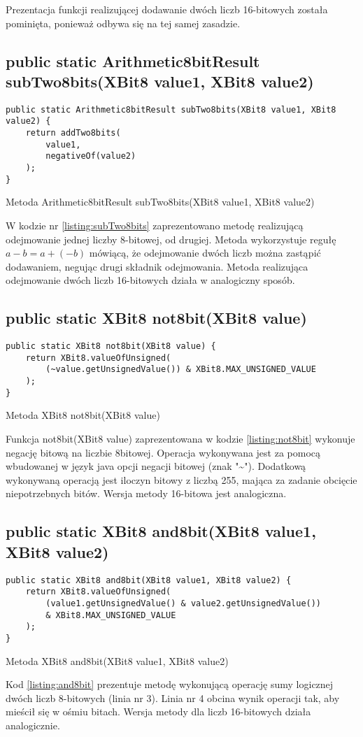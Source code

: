 	Prezentacja funkcji realizującej dodawanie dwóch liczb 16-bitowych została pominięta, ponieważ odbywa się na tej samej zasadzie.
	
	\subsection{public static Arithmetic8bitResult subTwo8bits(XBit8 value1, XBit8 value2)}
	\begin{listing}[h]
		\begin{verbatim}
public static Arithmetic8bitResult subTwo8bits(XBit8 value1, XBit8 value2) {
	return addTwo8bits(
		value1,
		negativeOf(value2)
	);
}
		\end{verbatim}
		\caption{Metoda Arithmetic8bitResult subTwo8bits(XBit8 value1, XBit8 value2)}
		\label{listing:subTwo8bits}
	\end{listing}
	W kodzie nr \ref{listing:subTwo8bits} zaprezentowano metodę realizującą odejmowanie jednej liczby 8-bitowej, od drugiej. Metoda wykorzystuje regułę 
	$ a - b = a+(-b) $ mówiącą, że odejmowanie dwóch liczb można zastąpić dodawaniem, negując drugi składnik odejmowania. 
	Metoda realizująca odejmowanie dwóch liczb 16-bitowych działa w analogiczny sposób.
	
	\subsection{public static XBit8 not8bit(XBit8 value)}
	\begin{listing}[h]
		\begin{verbatim}
public static XBit8 not8bit(XBit8 value) {
	return XBit8.valueOfUnsigned(
		(~value.getUnsignedValue()) & XBit8.MAX_UNSIGNED_VALUE
	);
}		
		\end{verbatim}
		\caption{Metoda XBit8 not8bit(XBit8 value)}
		\label{listing:not8bit}
	\end{listing}
	Funkcja not8bit(XBit8 value) zaprezentowana w kodzie \ref{listing:not8bit} wykonuje negację bitową na liczbie 8bitowej. Operacja wykonywana jest za pomocą wbudowanej w język java opcji negacji bitowej (znak "\~{}"). Dodatkową wykonywaną operacją jest iloczyn bitowy z liczbą 255, mająca za zadanie obcięcie niepotrzebnych bitów. Wersja metody 16-bitowa jest analogiczna.
	
	\subsection{public static XBit8 and8bit(XBit8 value1, XBit8 value2)}
	\begin{listing}[h]
		\begin{verbatim}
public static XBit8 and8bit(XBit8 value1, XBit8 value2) {
	return XBit8.valueOfUnsigned(
		(value1.getUnsignedValue() & value2.getUnsignedValue()) 
		& XBit8.MAX_UNSIGNED_VALUE
	);
}	
		\end{verbatim}
		\caption{Metoda XBit8 and8bit(XBit8 value1, XBit8 value2)}
		\label{listing:and8bit}
	\end{listing}
	Kod \ref{listing:and8bit} prezentuje metodę wykonującą operację sumy logicznej dwóch liczb 8-bitowych (linia nr 3). Linia nr 4 obcina wynik operacji tak, aby mieścił się w ośmiu bitach. Wersja metody dla liczb 16-bitowych działa analogicznie.
	
